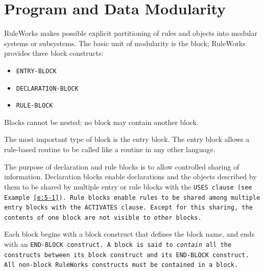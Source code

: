 \chapter{Program and Data Modularity}
\label{c:program}

RuleWorks makes possible explicit partitioning of rules and objects
into modular systems or subsystems. The basic unit of modularity is
the block; RuleWorks provides three block constructs:

\begin{itemize}
\item\tt{ENTRY-BLOCK}
\item\tt{DECLARATION-BLOCK}
\item\tt{RULE-BLOCK}
\end{itemize}

\begin{note}
  Blocks cannot be nested; no block may contain another block.
\end{note}

The most important type of block is the entry block. The entry block
allows a rule-based routine to be called like a routine in any other
language.

The purpose of declaration and rule blocks is to allow controlled
sharing of information.  Declaration blocks enable declarations and
the objects described by them to be shared by multiple entry or rule
blocks with the \tt{USES} clause (see Example~\ref{e:5-1}). Rule
blocks enable rules to be shared among multiple entry blocks with the
\tt{ACTIVATES} clause. Except for this sharing, the contents of one
block are not visible to other blocks.

Each block begins with a block construct that defines the block name,
and ends with an \tt{END-BLOCK} construct. A block is said to
\emph{contain} all the constructs between its block construct and its
\tt{END-BLOCK} construct. All non-block RuleWorks constructs must be
contained in a block.

